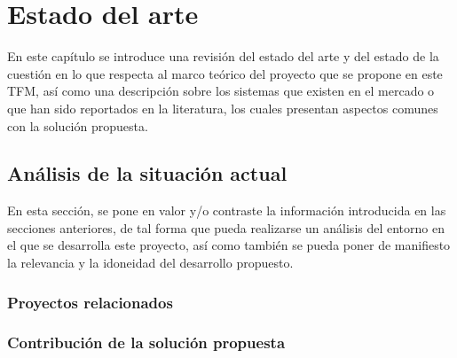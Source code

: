 \chapter{Estado del arte}
\label{chapter:estado_arte}



En este capítulo se introduce una revisión del estado del arte y del estado de la cuestión en lo que respecta al marco teórico del proyecto que se propone en este TFM, así como una descripción sobre los sistemas que existen en el mercado o que han sido reportados en la literatura, los cuales presentan aspectos comunes con la solución propuesta.


\section{Análisis de la situación actual}

En esta sección, se pone en valor y/o contraste la información introducida en las secciones anteriores, de tal forma que pueda realizarse un análisis del entorno en el que se desarrolla este proyecto, así como también se pueda poner de manifiesto la relevancia y la idoneidad del desarrollo propuesto. 


\subsection{Proyectos relacionados}


\subsection{Contribución de la solución propuesta}

